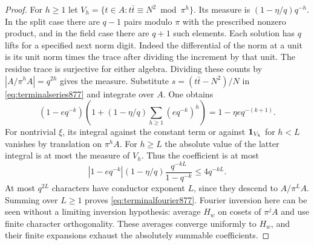 \documentclass[a4paper,11pt]{article}
\theoremstyle{definition}
\theoremstyle{remark}
\numberwithin{equation}{section}
\begin{document}
\begin{proof}
For \(h\ge1\) let
\(V_h=\{t\in A:t\bar t\equiv N^2\bmod\pi^h\}\).
Its measure is \((1-\eta/q)q^{-h}\). In the split case there
are \(q-1\) pairs modulo \(\pi\) with the prescribed nonzero
product, and in the field case there are \(q+1\) such elements.
Each solution has \(q\) lifts for a specified next norm digit.
Indeed the differential of the norm at a unit is its unit norm
times the trace after dividing the increment by that unit.
The residue trace is surjective for either algebra. Dividing
these counts by \(|A/\pi^h A|=q^{2h}\) gives the measure.
Substitute \(s=(t\bar t-N^2)/N\) in
\eqref{eq:terminalseries877} and integrate over \(A\). One obtains
\[
 (1-e q^{-k})
   \left(1+(1-\eta/q)\sum_{h\ge1}(e q^{-k})^h\right)
       =1-\eta e q^{-(k+1)}.
\]
For nontrivial \(\xi\), its integral against the constant term or
against \({\bf1}_{V_h}\) for \(h<L\) vanishes by translation on
\(\pi^h A\). For \(h\ge L\) the absolute value of the latter
integral is at most the measure of \(V_h\). Thus the coefficient
is at most
\[
    |1-e q^{-k}|(1-\eta/q)\frac{q^{-k L}}{1-q^{-k}}
       \le 4q^{-k L}.
\]
At most \(q^{2L}\) characters have conductor exponent \(L\), since
they descend to \(A/\pi^L A\). Summing over \(L\ge1\) proves
\eqref{eq:terminalfourier877}. Fourier inversion here can be seen
without a limiting inversion hypothesis: average \(H_w\) on cosets
of \(\pi^jA\) and use finite character orthogonality. These averages
converge uniformly to \(H_w\), and their finite expansions exhaust
the absolutely summable coefficients.
\end{proof}
\end{document}
